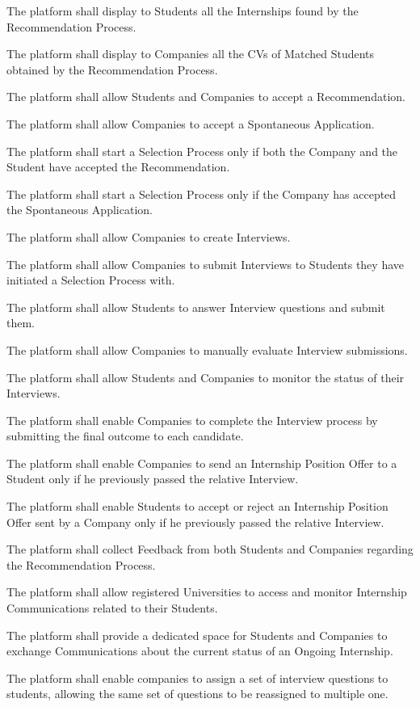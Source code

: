 \begin{enumerate}[label={\color{titleColor}[R\arabic*]}]
    \item The platform shall display to Students all the Internships found by the Recommendation Process.
    \item The platform shall display to Companies all the CVs of Matched Students obtained by the Recommendation Process.
    \item The platform shall allow Students and Companies to accept a Recommendation.
    \item The platform shall allow Companies to accept a Spontaneous Application.
    \item The platform shall start a Selection Process only if both the Company and the Student have accepted the Recommendation.
    \item The platform shall start a Selection Process only if the Company has accepted the Spontaneous Application.
    
    \item The platform shall allow Companies to create Interviews.
    \item The platform shall allow Companies to submit Interviews to Students they have initiated a Selection Process with.
    \item The platform shall allow Students to answer Interview questions and submit them.
    \item The platform shall allow Companies to manually evaluate Interview submissions.
    \item The platform shall allow Students and Companies to monitor the status of their Interviews.
    \item The platform shall enable Companies to complete the Interview process by submitting the final outcome to each candidate.

    \item The platform shall enable Companies to send an Internship Position Offer to a Student only if he previously passed the relative Interview.
    \item The platform shall enable Students to accept or reject an Internship Position Offer sent by a Company only if he previously passed the relative Interview.
    
    \item The platform shall collect Feedback from both Students and Companies regarding the Recommendation Process.
    \setcounter{enumi}{31}
    \item The platform shall allow registered Universities to access and monitor Internship Communications related to their Students.
    \setcounter{enumi}{32}
    \item The platform shall provide a dedicated space for Students and Companies to exchange Communications about the current status of an Ongoing Internship.
    \setcounter{enumi}{34}
    \item The platform shall enable companies to assign a set of interview questions to students, allowing the same set of questions to be reassigned to multiple one.
\end{enumerate}

